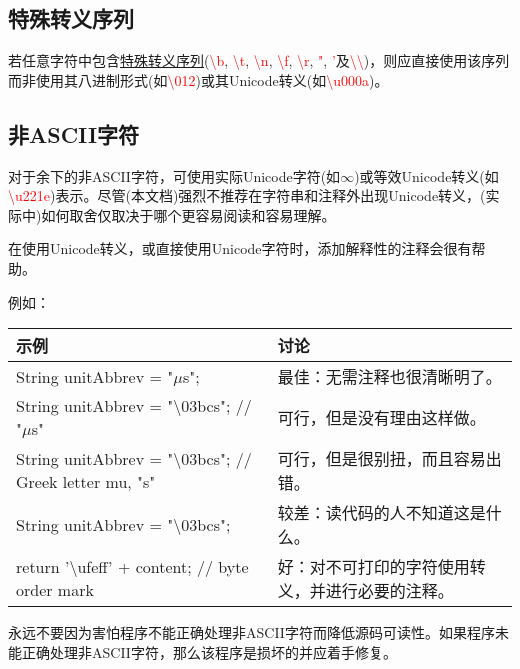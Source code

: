 \documentclass[cn,11pt,chinese]{elegantbook}
\begin{document}
\subsection{特殊转义序列}
若任意字符中包含\href{https://docs.oracle.com/javase/tutorial/java/data/characters.html}{特殊转义序列}(\textcolor{red}{\textbackslash b}, \textcolor{red}{\textbackslash t}, \textcolor{red}{\textbackslash n}, \textcolor{red}{\textbackslash f}, \textcolor{red}{\textbackslash r}, \textcolor{red}{"}, \textcolor{red}{'}及\textcolor{red}{\textbackslash \textbackslash})，则应直接使用该序列而非使用其八进制形式(如\textcolor{red}{\textbackslash 012})或其Unicode转义(如\textcolor{red}{\textbackslash u000a})。

\subsection{非ASCII字符}
对于余下的非ASCII字符，可使用实际Unicode字符(如$\infty$)或等效Unicode转义(如\textcolor{red}{\textbackslash u221e})表示。尽管(本文档)强烈不推荐在字符串和注释外出现Unicode转义，(实际中)如何取舍仅取决于哪个更容易阅读和容易理解。

\begin{remark}
	在使用Unicode转义，或直接使用Unicode字符时，添加解释性的注释会很有帮助。
\end{remark}

例如：
\begin{table}[!htb]
	\centering
	\begin{tabular}{|l|l|}
		\hline
		\textbf{示例} & \textbf{讨论}\\
		\hline
		String unitAbbrev = "$\mu $s";  & 最佳：无需注释也很清晰明了。 \\
		\hline
		String unitAbbrev = "\textbackslash 03bcs"; // "$\mu $s" & 可行，但是没有理由这样做。 \\
		\hline
		String unitAbbrev = "\textbackslash 03bcs"; // Greek letter mu, "s"   & 可行，但是很别扭，而且容易出错。 \\
		\hline
		String unitAbbrev = "\textbackslash 03bcs"; & 较差：读代码的人不知道这是什么。 \\
		\hline
		return '\textbackslash ufeff' + content; // byte order mark  &  好：对不可打印的字符使用转义，并进行必要的注释。 \\
		\hline
	\end{tabular}
\end{table}

\begin{remark}
	永远不要因为害怕程序不能正确处理非ASCII字符而降低源码可读性。如果程序未能正确处理非ASCII字符，那么该程序是损坏的并应着手修复。
\end{remark}
\end{document}
